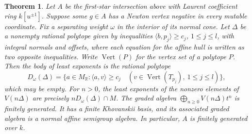\documentclass[11pt,reqno]{amsart}
\numberwithin{equation}{section}
\newtheorem{theorem}{Theorem}[section]
\theoremstyle{definition}
\theoremstyle{remark}
\begin{document}
\begin{theorem}\label{thm:polyhedral-newton-sections}
Let \(A\) be the first-star intersection above with Laurent coefficient
ring \(k[u^{\pm1}]\). Suppose some \(g\in A\) has a Newton vertex
negative in every mutable coordinate. Fix a separating weight \(\omega\)
in the interior of its normal cone. Let \(\Delta\) be a nonempty
rational polytope given by inequalities \(\langle b,p_j\rangle\ge c_j\),
\(1\le j\le l\), with integral normals and offsets, where each equation
for the affine hull is written as two opposite inequalities.
Write \(\operatorname{Vert}(P)\) for the vertex set of a polytope \(P\).
Then the body of least exponents is the rational polytope
\[ D_\omega(\Delta) =\{a\in M_{\mathbb R}: \langle a,v\rangle\ge c_j\quad (v\in\operatorname{Vert}(T_{p_j}),\ 1\le j\le l)\}, \]
which may be empty. For \(n>0\), the least exponents of the nonzero
elements of \(V(n\Delta)\) are precisely \(nD_\omega(\Delta)\cap M\).
The graded algebra \(\bigoplus_{n\ge0}V(n\Delta)t^n\) is finitely
generated. It has a finite \emph{Khovanskii basis}, and its associated
graded algebra is a normal affine semigroup algebra. In particular,
\(A\) is finitely generated over \(k\).
\end{theorem}
\end{document}
